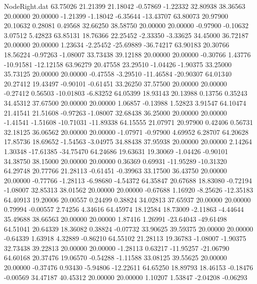 \begin{filecontents}{NodeRight.dat}
  63.75026   21.21399   21.18042    -0.57869   -1.22332   32.80938   38.36563   20.00000   20.00000   -1.21399   -1.18042   -6.35644  -13.43707
  63.80073   20.97900   20.10632     0.28081    0.49568   32.66250   38.58750   20.00000   20.00000   -0.97900   -0.10632    3.07512    5.42823
  63.85131   18.76366   22.25452    -2.33350   -3.33625   34.45000   36.72187   20.00000   20.00000    1.23634   -2.25452  -25.69889  -36.74217
  63.90183   20.30766   18.56224    -0.97263   -1.08007   33.73438   39.12188   20.00000   20.00000   -0.30766    1.43776  -10.91581  -12.12158
  63.96279   20.47558   23.29510    -1.04426   -1.90375   33.25000   35.73125   20.00000   20.00000   -0.47558   -3.29510  -11.46584  -20.90307
  64.01340   20.27412   19.43497    -0.90101   -0.61451   33.26250   37.57500   20.00000   20.00000   -0.27412    0.56503  -10.01803   -6.83252
  64.05399   18.93143   20.13988     0.13756    0.35243   34.45312   37.67500   20.00000   20.00000    1.06857   -0.13988    1.52823    3.91547
  64.10474   21.41541   21.51608    -0.97263   -1.08007   32.68438   36.25000   20.00000   20.00000   -1.41541   -1.51608  -10.71031  -11.89338
  64.15555   21.07971   20.97900     0.42406    0.56731   32.18125   36.06562   20.00000   20.00000   -1.07971   -0.97900    4.69952    6.28707
  64.20628   17.85736   18.69652    -1.54563   -3.04975   34.88438   37.95938   20.00000   20.00000    2.14264    1.30348  -17.61385  -34.75470
  64.24686   19.63631   19.30069    -1.04426   -0.90101   34.38750   38.15000   20.00000   20.00000    0.36369    0.69931  -11.95289  -10.31320
  64.29748   20.77766   21.28113    -0.61451   -0.39963   33.17500   36.43750   20.00000   20.00000   -0.77766   -1.28113   -6.98680   -4.54372
  64.35847   20.67688   18.83080    -0.72194   -1.08007   32.85313   38.01562   20.00000   20.00000   -0.67688    1.16920   -8.25626  -12.35183
  64.40913   19.20006   20.00557     0.24499    0.38824   34.02813   37.65937   20.00000   20.00000    0.79994   -0.00557    2.74256    4.34616
  64.45974   18.12584   18.73009    -2.11863   -4.44644   35.49688   38.66563   20.00000   20.00000    1.87416    1.26991  -23.64043  -49.61498
  64.51041   20.64339   18.36082     0.38824   -0.07732   33.90625   39.59375   20.00000   20.00000   -0.64339    1.63918    4.32889   -0.86210
  64.55102   21.28113   19.36783    -1.08007   -1.90375   32.73438   39.22813   20.00000   20.00000   -1.28113    0.63217  -11.95257  -21.06790
  64.60168   20.37476   19.06570    -0.54288   -1.11588   33.08125   39.55625   20.00000   20.00000   -0.37476    0.93430   -5.94806  -12.22611
  64.65250   18.89793   18.46153    -0.18476   -0.00569   34.47187   40.45312   20.00000   20.00000    1.10207    1.53847   -2.04208   -0.06293

\end{filecontents}
